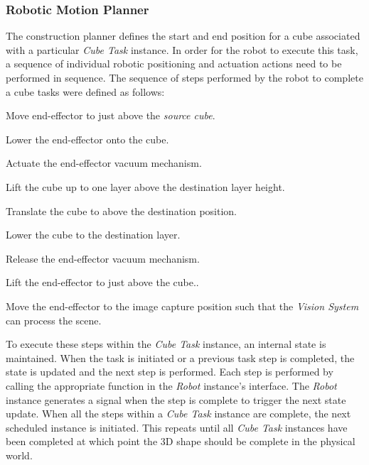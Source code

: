 \subsubsection{Robotic Motion Planner} \label{sec:Robotic Motion Planner}

The construction planner defines the start and end position for a cube associated with a particular \textit{Cube Task} instance. In order for the robot to execute this task, a sequence of individual robotic positioning and actuation actions need to be performed in sequence. The sequence of steps performed by the robot to complete a cube tasks were defined as follows:

\begin{compactenum}
	\item Move end-effector to just above the \textit{source cube}.
	\item Lower the end-effector onto the cube.
	\item Actuate the end-effector vacuum mechanism.
	\item Lift the cube up to one layer above the destination layer height.
	\item Translate the cube to above the destination position.
	\item Lower the cube to the destination layer.
	\item Release the end-effector vacuum mechanism.
	\item Lift the end-effector to just above the cube..
	\item Move the end-effector to the image capture position such that the \textit{Vision System} can process the scene.
\end{compactenum}

To execute these steps within the \textit{Cube Task} instance, an internal state is maintained. When the task is initiated or a previous task step is completed, the state is updated and the next step is performed. Each step is performed by calling the appropriate function in the \textit{Robot} instance's interface. The \textit{Robot} instance generates a signal when the step is complete to trigger the next state update. When all the steps within a \textit{Cube Task} instance are complete, the next scheduled instance is initiated. This repeats until all \textit{Cube Task} instances have been completed at which point the 3D shape should be complete in the physical world.

\newpage


